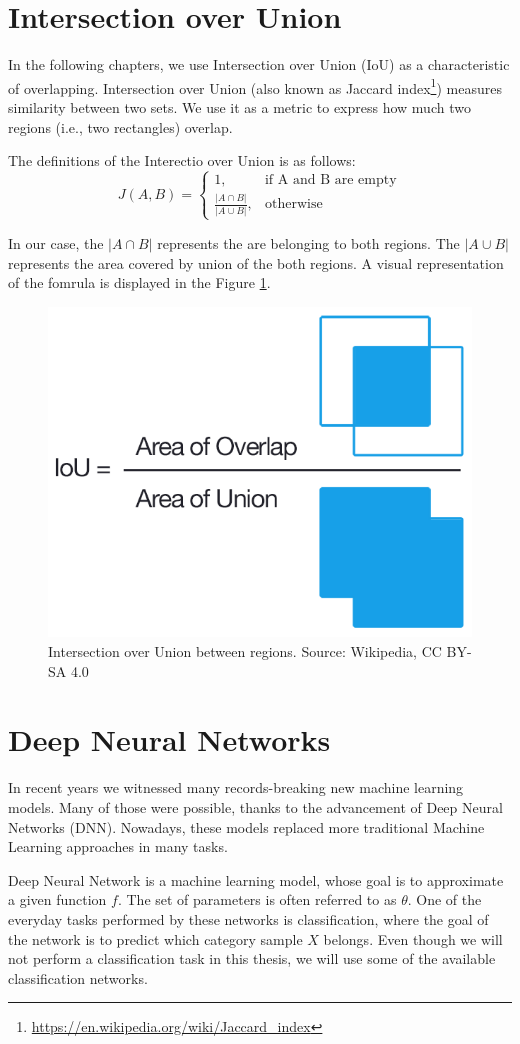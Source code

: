 \section{Intersection over Union}

In the following chapters, we use Intersection over Union (IoU) as a characteristic of overlapping. Intersection over Union (also known as Jaccard index\footnote{\href{https://en.wikipedia.org/wiki/Jaccard_index}{https://en.wikipedia.org/wiki/Jaccard\_index}}) measures similarity between two sets. We use it as a metric to express how much two regions (i.e., two rectangles) overlap. 

The definitions of the Interectio over Union is as follows:
$$
    J(A, B) = 
    \begin{cases}
      1, & \text{if\ A and B are empty} \\
      \frac{|A \cap B|}{|A \cup B|}, & \text{otherwise}
    \end{cases}
$$

In our case, the $|A \cap B|$ represents the are belonging to both regions. The  $|A \cup B|$ represents the area covered by union of the both regions. A visual representation of the fomrula is displayed in the Figure \ref{fig:intersection_over_union}.

\begin{figure}
    \centering
	\includegraphics[width=0.3\linewidth]{img/Intersection_over_Union_-_visual_equation.png}
	\caption{Intersection over Union between regions. Source: Wikipedia, CC BY-SA 4.0}
	\label{fig:intersection_over_union}
\end{figure}


\section{Deep Neural Networks}

In recent years we witnessed many records-breaking new machine learning models. Many of those were possible, thanks to the advancement of Deep Neural Networks (DNN). Nowadays, these models replaced more traditional Machine Learning approaches in many tasks.

Deep Neural Network is a machine learning model, whose goal is to approximate a given function \(f\). The set of parameters is often referred to as \(\theta\). One of the everyday tasks performed by these networks is classification, where the goal of the network is to predict which category sample \(X\) belongs. Even though we will not perform a classification task in this thesis, we will use some of the available classification networks.

